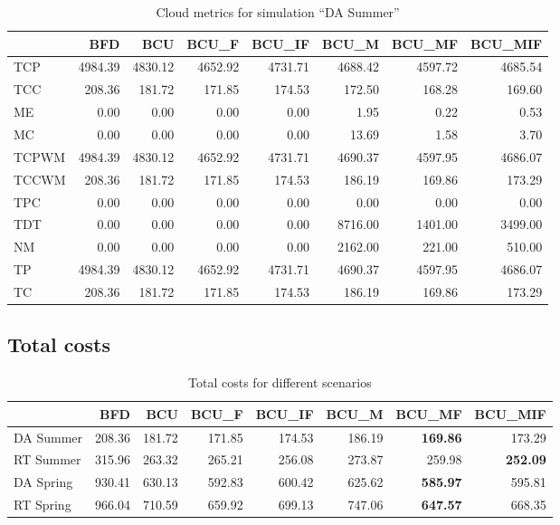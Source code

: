 \begin{table}[ht]
\centering
\begin{tabular}{lrrrrrrr}
\toprule
{} &      BFD &      BCU &    BCU\_F &   BCU\_IF &    BCU\_M &   BCU\_MF &  BCU\_MIF \\
\midrule
TCP   &  4984.39 &  4830.12 &  4652.92 &  4731.71 &  4688.42 &  4597.72 &  4685.54 \\
TCC   &   208.36 &   181.72 &   171.85 &   174.53 &   172.50 &   168.28 &   169.60 \\
ME    &     0.00 &     0.00 &     0.00 &     0.00 &     1.95 &     0.22 &     0.53 \\
MC    &     0.00 &     0.00 &     0.00 &     0.00 &    13.69 &     1.58 &     3.70 \\
TCPWM &  4984.39 &  4830.12 &  4652.92 &  4731.71 &  4690.37 &  4597.95 &  4686.07 \\
TCCWM &   208.36 &   181.72 &   171.85 &   174.53 &   186.19 &   169.86 &   173.29 \\
TPC   &     0.00 &     0.00 &     0.00 &     0.00 &     0.00 &     0.00 &     0.00 \\
TDT   &     0.00 &     0.00 &     0.00 &     0.00 &  8716.00 &  1401.00 &  3499.00 \\
NM    &     0.00 &     0.00 &     0.00 &     0.00 &  2162.00 &   221.00 &   510.00 \\
TP    &  4984.39 &  4830.12 &  4652.92 &  4731.71 &  4690.37 &  4597.95 &  4686.07 \\
TC    &   208.36 &   181.72 &   171.85 &   174.53 &   186.19 &   169.86 &   173.29 \\
\bottomrule
\end{tabular}
\caption{Cloud metrics for simulation "`DA Summer"'}
\end{table}



\subsection{Total costs}


\begin{table}[ht]
\centering

\begin{tabular}{lrrrrrrr}
\toprule
{} &     BFD &     BCU &   BCU\_F &  BCU\_IF &   BCU\_M &  BCU\_MF &  BCU\_MIF \\
\midrule
DA Summer &  208.36 &  181.72 &  171.85 &  174.53 &  186.19 &  \textbf{169.86} &   173.29 \\
RT Summer &  315.96 &  263.32 &  265.21 &  256.08 &  273.87 &  259.98 &   \textbf{252.09} \\
DA Spring &  930.41 &  630.13 &  592.83 &  600.42 &  625.62 &  \textbf{585.97} &   595.81 \\
RT Spring &  966.04 &  710.59 &  659.92 &  699.13 &  747.06 &  \textbf{647.57} &   668.35 \\
\bottomrule
\end{tabular}
\caption{Total costs for different scenarios}
\end{table}

